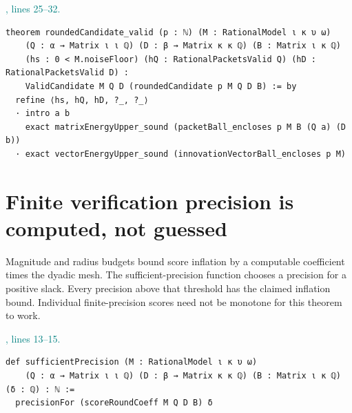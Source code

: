 \documentclass[11pt]{article}\usepackage{needspace}\renewcommand{\paperkind}{Lean companion}\setlength{\parskip}{0.35em}
\begin{document}
{\small\textcolor{teal}{, lines 25--32.}\par}

\begin{lstlisting}[style=BayesSource]
theorem roundedCandidate_valid (p : ℕ) (M : RationalModel ι κ υ ω)
    (Q : α → Matrix ι ι ℚ) (D : β → Matrix κ κ ℚ) (B : Matrix ι κ ℚ)
    (hs : 0 < M.noiseFloor) (hQ : RationalPacketsValid Q) (hD : RationalPacketsValid D) :
    ValidCandidate M Q D (roundedCandidate p M Q D B) := by
  refine ⟨hs, hQ, hD, ?_, ?_⟩
  · intro a b
    exact matrixEnergyUpper_sound (packetBall_encloses p M B (Q a) (D b))
  · exact vectorEnergyUpper_sound (innovationVectorBall_encloses p M)
\end{lstlisting}

\section{Finite verification precision is computed, not guessed}

Magnitude and radius budgets bound score inflation by a computable coefficient times the dyadic mesh. The sufficient-precision function chooses a precision for a positive slack. Every precision above that threshold has the claimed inflation bound. Individual finite-precision scores need not be monotone for this theorem to work.



{\small\textcolor{teal}{, lines 13--15.}\par}

\begin{lstlisting}[style=BayesSource]
def sufficientPrecision (M : RationalModel ι κ υ ω)
    (Q : α → Matrix ι ι ℚ) (D : β → Matrix κ κ ℚ) (B : Matrix ι κ ℚ) (δ : ℚ) : ℕ :=
  precisionFor (scoreRoundCoeff M Q D B) δ
\end{lstlisting}


\end{document}
